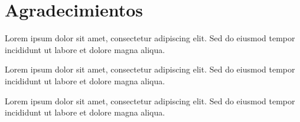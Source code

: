 \chapter*{Agradecimientos}
\ApplyAgradecimientosPageStyle
Lorem ipsum dolor sit amet, consectetur adipiscing elit. Sed do eiusmod tempor incididunt ut labore et dolore magna aliqua.


Lorem ipsum dolor sit amet, consectetur adipiscing elit. Sed do eiusmod tempor incididunt ut labore et dolore magna aliqua.


Lorem ipsum dolor sit amet, consectetur adipiscing elit. Sed do eiusmod tempor incididunt ut labore et dolore magna aliqua.
